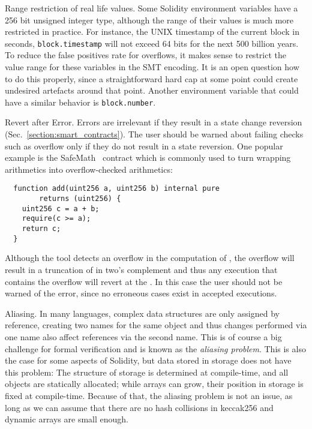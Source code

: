 \begin{paragraph}{Range restriction of real life values.}
Some Solidity environment variables have a 256 bit unsigned integer type,
although the range of their values is much more restricted in practice.
For instance, the UNIX timestamp of the current block in seconds,
\texttt{block.timestamp} will not exceed 64 bits for the next
500 billion years. To reduce the false positives rate for
overflows, it makes sense to restrict the value range for these
variables in the SMT encoding. It is an open question how to do
this properly, since a straightforward hard cap at some point
could create undesired artefacts around that point.
%
Another environment variable that could have a similar
behavior is \texttt{block.number}.
\end{paragraph}

\begin{paragraph}{Revert after Error.}
Errors are irrelevant if they result in a state change reversion
(Sec.~\ref{section:smart_contracts}). The user should be warned
about failing checks such as overflow only if they do not result in a state reversion.
%
One popular example is the SafeMath~\cite{SafeMath} contract which
is commonly used to turn wrapping arithmetics into overflow-checked arithmetics:

\begin{verbatim}
  function add(uint256 a, uint256 b) internal pure
        returns (uint256) {
    uint256 c = a + b;
    require(c >= a);
    return c;
  }
\end{verbatim}

Although the tool detects an overflow in the computation of ,
the overflow will result in a truncation of  in two's complement and thus
any execution that contains the overflow will revert at the .
%
In this case the user should not be warned of the error, since no erroneous cases
exist in accepted executions.
\end{paragraph}

\begin{paragraph}{Aliasing.}
In many languages, complex data structures are only assigned by
reference, creating two names for the same object and thus changes
performed via one name also affect references via the second name.
This is of course a big challenge for formal verification and
is known as the \emph{aliasing problem}.
This is also the case for some aspects of Solidity, but data stored
in storage does not have this problem: The structure of
storage is determined at compile-time, and all objects are
statically allocated; while arrays can grow, their position in
storage is fixed at compile-time. Because of that, the aliasing problem
is not an issue, as long as we can assume that there are no hash
collisions in keccak256 and dynamic arrays are small enough.
\end{paragraph}

